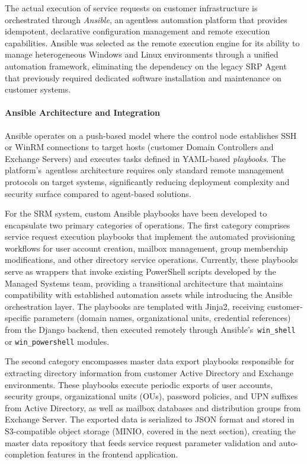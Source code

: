 The actual execution of service requests on customer infrastructure is orchestrated through \textit{Ansible}, an agentless automation platform that provides idempotent, declarative configuration management and remote execution capabilities. Ansible was selected as the remote execution engine for its ability to manage heterogeneous Windows and Linux environments through a unified automation framework, eliminating the dependency on the legacy SRP Agent that previously required dedicated software installation and maintenance on customer systems.

\paragraph{Ansible Architecture and Integration}

Ansible operates on a push-based model where the control node establishes SSH or WinRM connections to target hosts (customer Domain Controllers and Exchange Servers) and executes tasks defined in YAML-based \textit{playbooks}. The platform's~agentless architecture requires only standard remote management protocols on target systems, significantly reducing deployment complexity and security surface compared to agent-based solutions.

For the SRM system, custom Ansible playbooks have been developed to encapsulate two primary categories of operations. The first category comprises service request execution playbooks that implement the automated provisioning workflows for user account creation, mailbox management, group membership modifications, and other directory service operations. Currently, these playbooks serve as wrappers that invoke existing PowerShell scripts developed by the Managed Systems team, providing a transitional architecture that maintains compatibility with established automation assets while introducing the Ansible orchestration layer. The playbooks are templated with Jinja2, receiving customer-specific parameters (domain names, organizational units, credential references) from the Django backend, then executed remotely through Ansible's~\texttt{win\_shell} or \texttt{win\_powershell} modules.

The second category encompasses master data export playbooks responsible for extracting directory information from customer Active Directory and Exchange environments. These playbooks execute periodic exports of user accounts, security groups, organizational units (OUs), password policies, and UPN suffixes from Active Directory, as well as mailbox databases and distribution groups from Exchange Server. The exported data is serialized to JSON format and stored in S3-compatible object storage (MINIO, covered in the next section), creating the master data repository that feeds service request parameter validation and auto-completion features in the frontend application.

